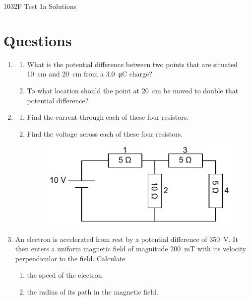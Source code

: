 \documentclass[11pt]{article}
\numberwithin{equation}{section}
\numberwithin{figure}{section}
\numberwithin{table}{section}
\begin{document}
\begin{center}
    {\huge 1032F Test 1a Solutions}\\
    \vspace{0.2in}
    
    
\end{center}

\section*{Questions}

\begin{enumerate}
    \item \begin{enumerate}
        \item What is the potential difference between two points that are situated \SI{10}{\centi\metre} and \SI{20}{\centi\metre} from a \SI{3.0}{\micro\coulomb} charge?
        \item To what location should the point at \SI{20}{\centi\metre} be moved to double that potential difference?
    \end{enumerate}

    \item \begin{enumerate}
        \item Find the current through each of these four resistors.
        \item Find the voltage across each of these four resistors.
        
        \begin{figure}[h]
            \begin{center}
                \includegraphics[width=.8\textwidth]{circuit.pdf}
            \end{center}
        \end{figure}
        
    \end{enumerate}

    \item An electron is accelerated from rest by a potential difference of \SI{350}{\volt}. It then enters a uniform magnetic field of magnitude \SI{200}{\milli\tesla} with its velocity perpendicular to the field. Calculate
    \begin{enumerate}
        \item the speed of the electron.
        \item the radius of its path in the magnetic field.
    \end{enumerate}
\end{enumerate}
\end{document}

